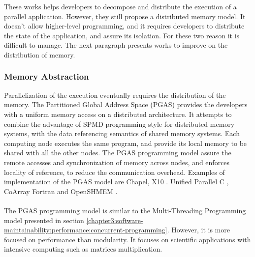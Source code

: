 These works helps developers to decompose and distribute the execution of a parallel application.
However, they still propose a distributed memory model.
It doesn't allow higher-level programming, and it requires developers to distribute the state of the application, and assure its isolation.
For these two reason it is difficult to manage.
The next paragraph presents works to improve on the distribution of memory.


\subsubsection{Memory Abstraction}

Parallelization of the execution eventually requires the distribution of the memory.
The Partitioned Global Address Space (PGAS) provides the developers with a uniform memory access on a distributed architecture.
It attempts to combine the advantage of SPMD programming style for distributed memory systems, with the data referencing semantics of shared memory systems.
Each computing node executes the same program, and provide its local memory to be shared with all the other nodes.
The PGAS programming model assure the remote accesses and synchronization of memory across nodes, and enforces locality of reference, to reduce the communication overhead.
Examples of implementation of the PGAS model are 
Chapel\cite{Chamberlain2007},
X10 \cite{Charles2005}.
Unified Parallel C \cite{El-Ghazawi2006},
CoArray Fortran \cite{Numrich1998} and
OpenSHMEM \cite{Chapman2010}.


\paragraph{}


The PGAS programming model is similar to the Multi-Threading Programming model presented in section \ref{chapter3:software-maintainability:performance:concurrent-programming}. 
However, it is more focused on performance than modularity.
It focuses on scientific applications with intensive computing such as matrices multiplication.



